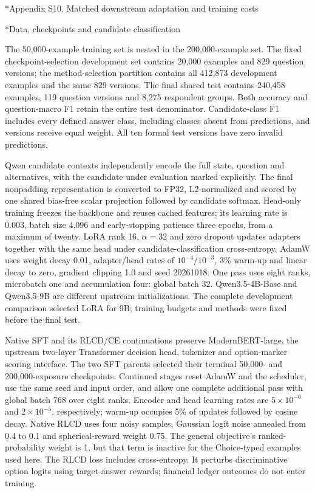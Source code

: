 \documentclass[10pt]{article}
\makeatletter
\renewcommand\section{\@startsection{section}{1}{\z@}{-2.2ex plus -1ex minus -.2ex}{.9ex plus .2ex}{\normalfont\large\mdseries}}
\renewcommand\subsection{\@startsection{subsection}{2}{\z@}{-1.7ex plus -.5ex minus -.2ex}{.6ex plus .2ex}{\normalfont\normalsize\mdseries}}
\makeatother
\begin{document}
\section*{Appendix S10. Matched downstream adaptation and training costs}

\subsection*{Data, checkpoints and candidate classification}

The 50,000-example training set is nested in the 200,000-example set. The fixed checkpoint-selection development set contains 20,000 examples and 829 question versions; the method-selection partition contains all 412,873 development examples and the same 829 versions. The final shared test contains 240,458 examples, 119 question versions and 8,275 respondent groups. Both accuracy and question-macro F1 retain the entire test denominator. Candidate-class F1 includes every defined answer class, including classes absent from predictions, and versions receive equal weight. All ten formal test versions have zero invalid predictions.

Qwen candidate contexts independently encode the full state, question and alternatives, with the candidate under evaluation marked explicitly. The final nonpadding representation is converted to FP32, L2-normalized and scored by one shared bias-free scalar projection followed by candidate softmax. Head-only training freezes the backbone and reuses cached features; its learning rate is 0.003, batch size 4,096 and early-stopping patience three epochs, from a maximum of twenty. LoRA rank 16, $\alpha=32$ and zero dropout updates adapters together with the same head under candidate-classification cross-entropy. AdamW uses weight decay 0.01, adapter/head rates of $10^{-4}/10^{-3}$, 3\% warm-up and linear decay to zero, gradient clipping 1.0 and seed 20261018. One pass uses eight ranks, microbatch one and accumulation four: global batch 32. Qwen3.5-4B-Base and Qwen3.5-9B are different upstream initializations. The complete development comparison selected LoRA for 9B; training budgets and methods were fixed before the final test.

Native SFT and its RLCD/CE continuations preserve ModernBERT-large, the upstream two-layer Transformer decision head, tokenizer and option-marker scoring interface. The two SFT parents selected their terminal 50,000- and 200,000-exposure checkpoints. Continued stages reset AdamW and the scheduler, use the same seed and input order, and allow one complete additional pass with global batch 768 over eight ranks. Encoder and head learning rates are $5\times10^{-6}$ and $2\times10^{-5}$, respectively; warm-up occupies 5\% of updates followed by cosine decay. Native RLCD uses four noisy samples, Gaussian logit noise annealed from 0.4 to 0.1 and spherical-reward weight 0.75. The general objective's ranked-probability weight is 1, but that term is inactive for the Choice-typed examples used here. The RLCD loss includes cross-entropy. It perturbs discriminative option logits using target-answer rewards; financial ledger outcomes do not enter training.
\end{document}
